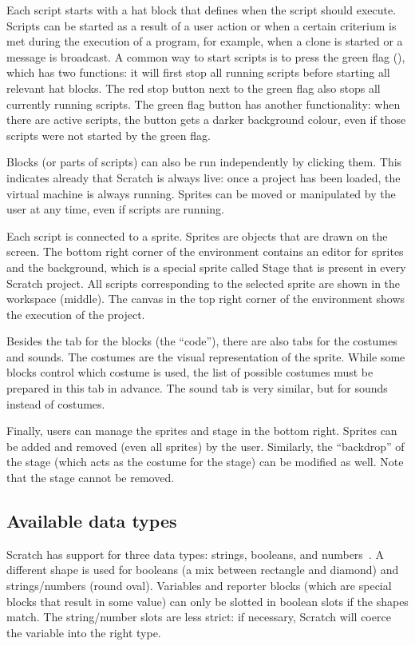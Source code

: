 \documentclass[../main]{subfiles}
\begin{document}
Each script starts with a hat block that defines when the script should execute.
Scripts can be started as a result of a user action or when a certain criterium is met during the execution of a program, for example, when a clone is started or a message is broadcast.
A common way to start scripts is to press the green flag (\greenflag), which has two functions: it will first stop all running scripts before starting all relevant hat blocks.
The red stop button next to the green flag also stops all currently running scripts.
The green flag button has another functionality: when there are active scripts, the button gets a darker background colour, even if those scripts were not started by the green flag.

Blocks (or parts of scripts) can also be run independently by clicking them.
This indicates already that Scratch is always live: once a project has been loaded, the virtual machine is always running.
Sprites can be moved or manipulated by the user at any time, even if scripts are running.

Each script is connected to a sprite.
Sprites are objects that are drawn on the screen.
The bottom right corner of the environment contains an editor for sprites and the background, which is a special sprite called Stage that is present in every Scratch project.
All scripts corresponding to the selected sprite are shown in the workspace (middle).
The canvas in the top right corner of the environment shows the execution of the project.

Besides the tab for the blocks (the ``code''), there are also tabs for the costumes and sounds.
The costumes are the visual representation of the sprite.
While some blocks control which costume is used, the list of possible costumes must be prepared in this tab in advance.
The sound tab is very similar, but for sounds instead of costumes.

Finally, users can manage the sprites and stage in the bottom right.
Sprites can be added and removed (even all sprites) by the user.
Similarly, the ``backdrop'' of the stage (which acts as the costume for the stage) can be modified as well.
Note that the stage cannot be removed.

\subsection{Available data types}\label{subsec:scratch-data-types}

Scratch has support for three data types: strings, booleans, and numbers~\autocite{maloneyScratchProgrammingLanguage2010a}.
A different shape is used for booleans (a mix between rectangle and diamond) and strings/numbers (round oval).
Variables and reporter blocks (which are special blocks that result in some value) can only be slotted in boolean slots if the shapes match.
The string/number slots are less strict: if necessary, Scratch will coerce the variable into the right type.
\end{document}
